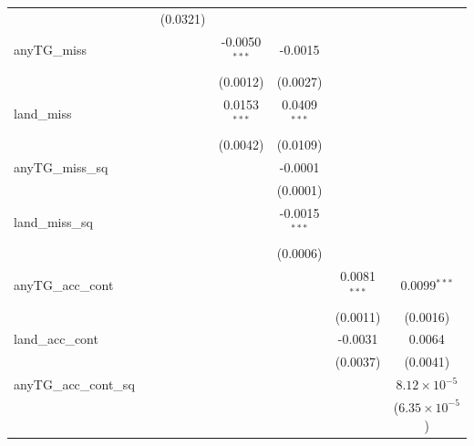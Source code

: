 \documentclass{article}
\begin{document}
\begin{table}[htbp]
\begin{tabular}{lcccccc}
                              &                 & (0.0321)        &                 &                 &                &   \\   
      anyTG\_miss             &                 &                 & -0.0050$^{***}$ & -0.0015         &                &   \\   
                              &                 &                 & (0.0012)        & (0.0027)        &                &   \\   
      land\_miss              &                 &                 & 0.0153$^{***}$  & 0.0409$^{***}$  &                &   \\   
                              &                 &                 & (0.0042)        & (0.0109)        &                &   \\   
      anyTG\_miss\_sq         &                 &                 &                 & -0.0001         &                &   \\   
                              &                 &                 &                 & (0.0001)        &                &   \\   
      land\_miss\_sq          &                 &                 &                 & -0.0015$^{***}$ &                &   \\   
                              &                 &                 &                 & (0.0006)        &                &   \\   
      anyTG\_acc\_cont        &                 &                 &                 &                 & 0.0081$^{***}$ & 0.0099$^{***}$\\   
                              &                 &                 &                 &                 & (0.0011)       & (0.0016)\\   
      land\_acc\_cont         &                 &                 &                 &                 & -0.0031        & 0.0064\\   
                              &                 &                 &                 &                 & (0.0037)       & (0.0041)\\   
      anyTG\_acc\_cont\_sq    &                 &                 &                 &                 &                & $8.12\times 10^{-5}$\\    
                              &                 &                 &                 &                 &                & ($6.35\times 10^{-5}$)\\    

\end{tabular}
\end{table}
\end{document}
